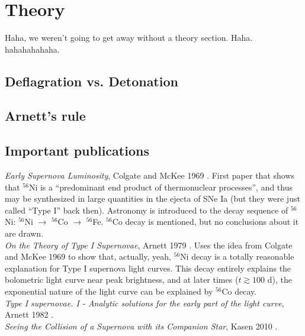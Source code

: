 \section{Theory}
Haha, we weren't going to get away without a theory section. Haha. hahahahahaha.

\subsection{Deflagration vs. Detonation}

\subsection{Arnett's rule}

\subsection{Important publications}

\textit{Early Supernova Luminosity}, Colgate and McKee 1969 \cite{colgatemckee1969}. First paper that shows that $^{56}$Ni is a ``predominant end product of thermonuclear processes'', and thus may be synthesized in large quantities in the ejecta of SNe Ia (but they were just called ``Type I'' back then). Astronomy is introduced to the decay sequence of $^{56}$Ni: $^{56}$Ni $\rightarrow$ $^{56}$Co $\rightarrow$ $^{56}$Fe. $^{56}$Co decay is mentioned, but no conclusions about it are drawn.\\

\textit{On the Theory of Type I Supernovae}, Arnett 1979 \cite{arnett1979}. Uses the idea from Colgate and McKee 1969 \cite{colgatemckee1969} to show that, actually, yeah, $^{56}$Ni decay is a totally reasonable explanation for Type I supernova light curves. This decay entirely explains the bolometric light curve near peak brightness, and at later times ($t \gtrsim 100$ d), the exponential nature of the light curve can be explained by $^{56}$Co decay. \\

\textit{Type I supernovae. I - Analytic solutions for the early part of the light curve}, Arnett 1982 \cite{Arnett1982}. \\

\textit{Seeing the Collision of a Supernova with its Companion Star}, Kasen 2010 \cite{kasen2010}.